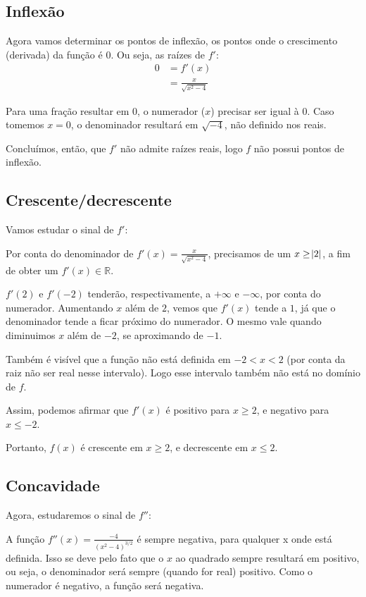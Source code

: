 \documentclass[12pt]{article}
\theoremstyle{definition}
\begin{document}
\subsection{Inflexão}
Agora vamos determinar os pontos de inflexão, os pontos onde o crescimento (derivada) da função é \(0\). Ou seja, as raízes de \(f'\):
\begin{align*}
    0
    &= f'(x) \\
    &= \frac{x}{\sqrt{x^2-4}}
\end{align*}

Para uma fração resultar em \(0\), o numerador (\(x\)) precisar ser igual à \(0\). Caso tomemos \(x = 0\), o denominador resultará em \(\sqrt{-4}\), não definido nos reais.

Concluímos, então, que \(f'\) não admite raízes reais, logo \(f\) não possui pontos de inflexão.
\subsection{Crescente/decrescente}
Vamos estudar o sinal de \(f'\):

Por conta do denominador de \(f'(x) = \frac{x}{\sqrt{x^2-4}}\), precisamos de um \(x \geq \abs{2}\), a fim de obter um \(f'(x) \in \mathbb{R}\).

\(f'(2)\) e \(f'(-2)\) tenderão, respectivamente, a \(+\infty\) e \(-\infty\), por conta do numerador.
Aumentando \(x\) além de \(2\), vemos que \(f'(x)\) tende a \(1\), já que o denominador tende a ficar próximo do numerador. O mesmo vale quando diminuimos \(x\) além de \(-2\), se aproximando de \(-1\).

Também é visível que a função não está definida em \(-2 < x < 2\) (por conta da raiz não ser real nesse intervalo). Logo esse intervalo também não está no domínio de \(f\).

Assim, podemos afirmar que \(f'(x)\) é positivo para \(x \geq 2\), e negativo para \(x\leq -2\).

Portanto, \(f(x)\) é crescente em \(x \geq 2\), e decrescente em \(x \leq 2\).
\subsection{Concavidade}
Agora, estudaremos o sinal de \(f''\):

A função \(f''(x) = \frac{-4}{{(x^2-4)}^{3/2}}\) é sempre negativa, para qualquer x onde está definida. Isso se deve pelo fato que o \(x\) ao quadrado sempre resultará em positivo, ou seja, o denominador será sempre (quando for real) positivo. Como o numerador é negativo, a função será negativa.
\end{document}
